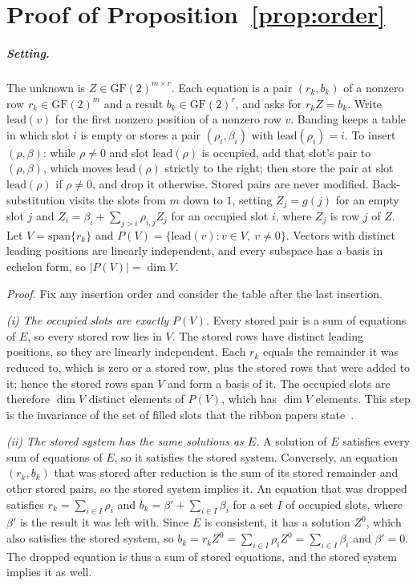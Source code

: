 \documentclass[a4paper,UKenglish,cleveref,autoref,thm-restate,anonymous]{lipics-v2021}
\begin{document}
\section{Proof of Proposition~\ref{prop:order}}\label{app:proof}
\subparagraph*{Setting.} The unknown is $Z\in\mathrm{GF}(2)^{m\times r}$. Each equation is a pair
$(r_k,b_k)$ of a nonzero row $r_k\in\mathrm{GF}(2)^m$ and a result $b_k\in\mathrm{GF}(2)^r$, and
asks for $r_kZ=b_k$. Write $\mathrm{lead}(v)$ for the first nonzero position of a nonzero row $v$.
Banding keeps a table in which slot $i$ is empty or stores a pair $(\rho_i,\beta_i)$ with
$\mathrm{lead}(\rho_i)=i$. To insert $(\rho,\beta)$: while $\rho\neq 0$ and slot
$\mathrm{lead}(\rho)$ is occupied, add that slot's pair to $(\rho,\beta)$, which moves
$\mathrm{lead}(\rho)$ strictly to the right; then store the pair at slot $\mathrm{lead}(\rho)$ if
$\rho\neq 0$, and drop it otherwise. Stored pairs are never modified. Back-substitution visits the
slots from $m$ down to $1$, setting $Z_j=g(j)$ for an empty slot $j$ and
$Z_i=\beta_i+\sum_{j>i}\rho_{i,j}Z_j$ for an occupied slot $i$, where $Z_j$ is row $j$ of $Z$.
Let $V=\mathrm{span}\{r_k\}$ and $P(V)=\{\mathrm{lead}(v) : v\in V,\ v\neq 0\}$. Vectors with
distinct leading positions are linearly independent, and every subspace has a basis in echelon
form, so $|P(V)|=\dim V$.

\emph{Proof.} Fix any insertion order and consider the table after the last insertion.

\emph{(i) The occupied slots are exactly $P(V)$.} Every stored pair is a sum of equations of $E$,
so every stored row lies in $V$. The stored rows have distinct leading positions, so they are
linearly independent. Each $r_k$ equals the remainder it was reduced to, which is zero or a stored
row, plus the stored rows that were added to it; hence the stored rows span $V$ and form a basis
of it. The occupied slots are therefore $\dim V$ distinct elements of $P(V)$, which has $\dim V$
elements. This step is the invariance of the set of filled slots that the ribbon papers
state~\cite{dillinger2021ribbon,dietzfelbinger2026ribbon}.

\emph{(ii) The stored system has the same solutions as $E$.} A solution of $E$ satisfies every sum
of equations of $E$, so it satisfies the stored system. Conversely, an equation $(r_k,b_k)$ that
was stored after reduction is the sum of its stored remainder and other stored pairs, so the
stored system implies it. An equation that was dropped satisfies $r_k=\sum_{i\in I}\rho_i$ and
$b_k=\beta'+\sum_{i\in I}\beta_i$ for a set $I$ of occupied slots, where $\beta'$ is the result it
was left with. Since $E$ is consistent, it has a solution $Z^0$, which also satisfies the stored
system, so $b_k=r_kZ^0=\sum_{i\in I}\rho_iZ^0=\sum_{i\in I}\beta_i$ and $\beta'=0$. The dropped
equation is thus a sum of stored equations, and the stored system implies it as well.
\end{document}
